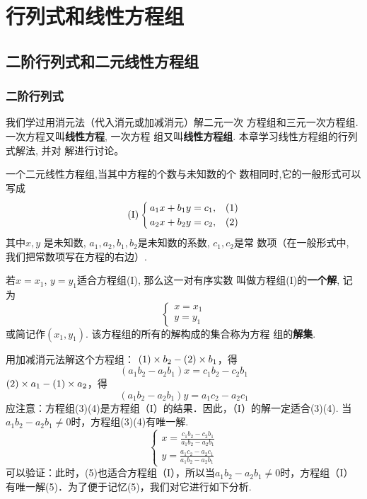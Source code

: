 \chapter{行列式和线性方程组}

\section{二阶行列式和二元线性方程组}

\subsection{二阶行列式}
我们学过用消元法（代入消元或加减消元）解二元一次
方程组和三元一次方程组. 一次方程又叫\textbf{线性方程}, 一次方程
组又叫\textbf{线性方程组}. 本章学习线性方程组的行列式解法, 并对
解进行讨论。

一个二元线性方程组,当其中方程的个数与未知数的个
数相同时,它的一般形式可以写成
\[({\rm I})\begin{cases}
    a_1x+b_1y=c_1, & (1)\\
    a_2x+b_2y=c_2, & (2)
\end{cases}\]
其中$x,y$ 是未知数, $a_1,a_2,b_1,b_2$是未知数的系数, $c_1,c_2$是常
数项（在一般形式中, 我们把常数项写在方程的右边）. 

若$x=x_1$, $y=y_1$适合方程组(I), 那么这一对有序实数
叫做方程组(I)的\textbf{一个解}, 记为
\[\begin{cases}
  x=x_1\\
y=y_1  
\end{cases}\]
或简记作$(x_1,y_1)$. 该方程组的所有的解构成的集合称为方程
组的\textbf{解集}. 

用加减消元法解这个方程组：
$(1)\times b_2-(2)\times b_1$，得
\begin{equation}
  (a_1b_2-a_2b_1)x=c_1b_2-c_2b_1\tag{3}
\end{equation}
$(2)\times a_1-(1)\times a_2$，得
\begin{equation}
  (a_1b_2-a_2b_1)y=a_1c_2-a_2c_1 \tag{4}
\end{equation}
应注意：方程组(3)(4)是方程组（I）的结果．因此，（I）的解一定适合(3)(4). 当$a_1b_2-a_2b_1\ne  0$时，方程组(3)(4)有唯一解.
\begin{equation}
\begin{cases}
  x=\frac{c_1b_2-c_2b_1}{a_1b_2-a_2b_1}\\
  y=\frac{a_1c_2-a_2c_1}{a_1b_2-a_2b_1}  
\end{cases}
\tag{5}
\end{equation}
可以验证：此时，(5)也适合方程组（I），所以当$a_1b_2-a_2b_1\ne  0$时，方程组（I）有唯一解(5)．为了便于记忆(5)，我们对它进行如下分析.

